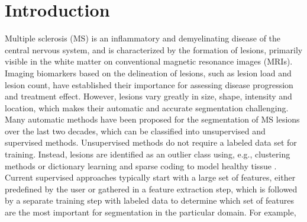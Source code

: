 \section{Introduction}


Multiple sclerosis (MS) is an inflammatory and demyelinating disease of the
central nervous system, and is characterized by the formation of lesions,
primarily visible in the white matter on conventional magnetic resonance images
(MRIs). Imaging biomarkers based on the delineation of lesions, such as lesion
load and lesion count, have established their importance for assessing disease
progression and treatment effect. However, lesions vary greatly in size, shape,
intensity and location, which makes their automatic and accurate segmentation
challenging. Many automatic methods have been proposed for the segmentation of
MS \mbox{lesions} over the last two decades, which can be classified into
unsupervised and supervised methods. Unsupervised methods do not require a labeled data set
for training. Instead, lesions are identified as an outlier class using, e.g.,
clustering methods \cite{souplet2008} or dictionary learning and sparse coding
to model healthy tissue \cite{weiss2013}. Current supervised approaches
typically start with a large set of features, either predefined by the user
\cite{geremia2010} or gathered in a feature extraction step, which is followed
by a separate training step with labeled data to determine which set of features
are the most important for segmentation in the particular domain. For example,
